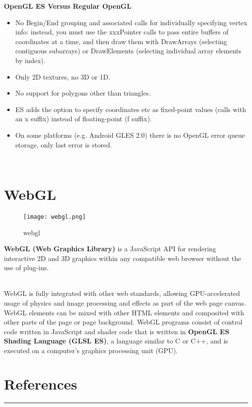 \documentclass[onecolumn]{article}
\begin{document}
\textbf{OpenGL ES Versus Regular OpenGL}

\begin{itemize}
\item No Begin/End grouping and associated calls for individually specifying vertex info: instead, you must use the xxxPointer calls to pass entire buffers of coordinates at a time, and then draw them with DrawArrays (selecting contiguous subarrays) or DrawElements (selecting individual array elements by index).
\item Only 2D textures, no 3D or 1D.
\item No support for polygons other than triangles.
\item ES adds the option to specify coordinates etc as fixed-point values (calls with an x suffix) instead of floating-point (f suffix).
\item On some platforms (e.g. Android GLES 2.0) there is no OpenGL error queue storage, only last error is stored.
\end{itemize}

\\
\section{WebGL}
\label{sec:4}

\begin{figure}[ht!]
\centering
\texttt{[image: webgl.png]}
\caption{webgl \label{}}
\end{figure}
\begin{story}[WebGL]
\textbf{WebGL (Web Graphics Library) }is a JavaScript API for rendering interactive 2D and 3D graphics within any compatible web browser without the use of plug-ins.
\end{story}
\\WebGL is fully integrated with other web standards, allowing GPU-accelerated usage of physics and image processing and effects as part of the web page canvas. WebGL elements can be mixed with other HTML elements and composited with other parts of the page or page background. WebGL programs consist of control code written in JavaScript and shader code that is written in \textbf{OpenGL ES Shading Language (GLSL ES)}, a language similar to C or C++, and is executed on a computer's graphics processing unit (GPU). 




\section{References}
\noindent
{\color{red} \rule{\linewidth}{0.5mm} }
\end{document}

